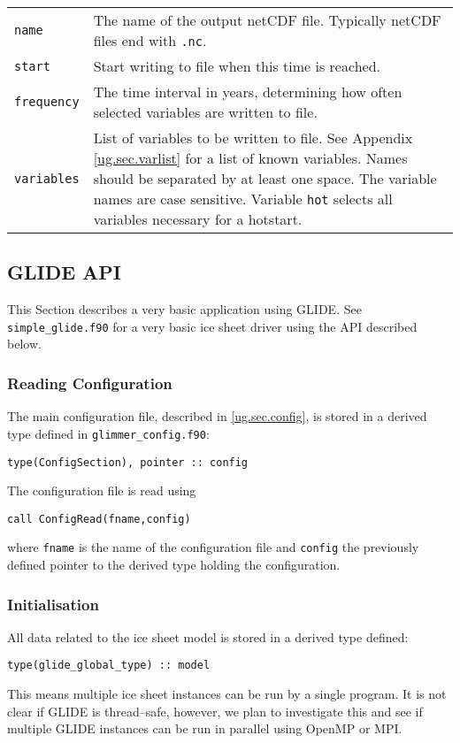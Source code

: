 \begin{center}
\begin{supertabular}{|l|p{11cm}|}
    \hline
    \texttt{name} & The name of the output netCDF file. Typically netCDF files end with \texttt{.nc}.\\
    \texttt{start} & Start writing to file when this time is reached.\\
    \texttt{frequency} & The time interval in years, determining how often selected variables are written to file.\\
    \texttt{variables} & List of variables to be written to file. See Appendix \ref{ug.sec.varlist} for a list of known variables. Names should be separated by at least one space. The variable names are case sensitive. Variable \texttt{hot} selects all variables necessary for a hotstart.\\
    \hline
  \end{supertabular}
\end{center}

\subsection{GLIDE API}
This Section describes a very basic application using GLIDE. See \texttt{simple\_glide.f90} for a very basic ice sheet driver using the API described below.
\subsubsection{Reading Configuration}
The main configuration file, described in \ref{ug.sec.config}, is stored in a derived type defined in \texttt{glimmer\_config.f90}:
\begin{verbatim}
type(ConfigSection), pointer :: config
\end{verbatim}
The configuration file is read using
\begin{verbatim}
call ConfigRead(fname,config)
\end{verbatim}
where \texttt{fname} is the name of the configuration file and \texttt{config} the previously defined pointer to the derived type holding the configuration.

\subsubsection{Initialisation}
All data related to the ice sheet model is stored in a derived type defined:
\begin{verbatim}
type(glide_global_type) :: model
\end{verbatim}
This means multiple ice sheet instances can be run by a single program. It is not clear if GLIDE is thread--safe, however, we plan to investigate this and see if multiple GLIDE instances can be run in parallel using OpenMP or MPI.

